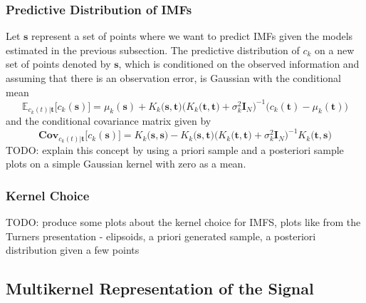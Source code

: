 \documentclass[article,moreauthors,pdftex,10pt,a4paper]{ssrn}
\begin{document}
\subsubsection{Predictive Distribution of IMFs}
Let $\mathbf{s}$ represent a set of points where we want to predict IMFs given the models estimated in the previous subsection.  The predictive distribution of $c_k$ on a new set of points denoted by $\mathbf{s}$, which is conditioned on the observed information and assuming that there is an observation error, is Gaussian with the conditional mean
\begin{equation*}
\mathbb{E}_{c_k(t)|\mathbf{t}} \big[c_k(\mathbf{s})] = \mu_k(\mathbf{s}) +  K_k \big(\mathbf{s},\mathbf{t}\big)\Big( K_k \big(\mathbf{t},\mathbf{t}\big) + \sigma^2_k \mathbf{I}_N \Big) ^{-1} \big( c_k(\mathbf{t}) - \mu_k(\mathbf{t})\big) 
\end{equation*}
and the conditional covariance matrix given by
\begin{equation*}
\mathbf{Cov}_{c_k(t)|\mathbf{t}} \big[c_k(\mathbf{s})] = K_k \big(\mathbf{s},\mathbf{s}\big) - K_k\big(\mathbf{s},\mathbf{t}\big) \Big( K_k \big(\mathbf{t},\mathbf{t}\big) + \sigma^2_k \mathbf{I}_N \Big)^{-1} K_k \big(\mathbf{t},\mathbf{s}\big) 
\end{equation*}
TODO: explain this concept by using a priori sample and a posteriori sample plots on a simple Gaussian kernel with zero as a mean. 


\subsubsection{Kernel Choice}
TODO: produce some plots about the kernel choice for IMFS, plots like from the Turners presentation - elipsoids, a priori generated sample, a posteriori distribution given a few points

\subsection{Multikernel Representation of the Signal}
\end{document}
